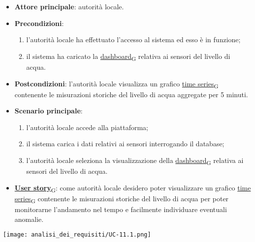 \begin{itemize}
	\item \textbf{Attore principale}: autorità locale.
	\item \textbf{Precondizioni}:
	      \begin{enumerate}
		      \item l'autorità locale ha effettuato l'accesso al sistema ed esso è in funzione;
		      \item il sistema ha caricato la \href{https://7last.github.io/docs/pb/documentazione-interna/glossario\#dashboard}{dashboard\textsubscript{G}} relativa ai sensori del livello di acqua.
	      \end{enumerate}
	\item \textbf{Postcondizioni}: l'autorità locale visualizza un grafico \href{https://7last.github.io/docs/pb/documentazione-interna/glossario\#time-series}{time series\textsubscript{G}} contenente le misurazioni storiche
	      del livello di acqua aggregate per 5 minuti.
	\item \textbf{Scenario principale}:
	      \begin{enumerate}
		      \item l'autorità locale accede alla piattaforma;
		      \item il sistema carica i dati relativi ai sensori interrogando il database;
		      \item l'autorità locale seleziona la visualizzazione della \href{https://7last.github.io/docs/pb/documentazione-interna/glossario\#dashboard}{dashboard\textsubscript{G}} relativa ai sensori del livello di acqua.
	      \end{enumerate}
	\item \href{https://7last.github.io/docs/pb/documentazione-interna/glossario\#user-story}{\textbf{User story}\textsubscript{G}}:
	      come autorità locale desidero poter visualizzare un grafico \href{https://7last.github.io/docs/pb/documentazione-interna/glossario\#time-series}{time series\textsubscript{G}} contenente le misurazioni storiche
	      del livello di acqua per poter monitorarne l'andamento nel tempo e facilmente individuare eventuali anomalie.
\end{itemize}
\begin{center}
	\texttt{[image: analisi\_dei\_requisiti/UC-11.1.png]}
\end{center}


